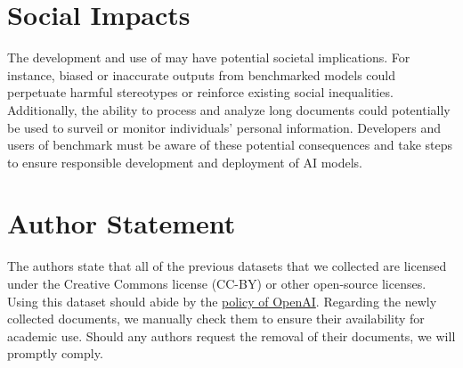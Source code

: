 \section{Social Impacts}
\label{appendix: social_impacts}
The development and use of \benchmarkname may have potential societal implications. For instance, biased or inaccurate outputs from benchmarked models could perpetuate harmful stereotypes or reinforce existing social inequalities. Additionally, the ability to process and analyze long documents could potentially be used to surveil or monitor individuals' personal information. Developers and users of \benchmarkname benchmark must be aware of these potential consequences and take steps to ensure responsible development and deployment of AI models.

\section{Author Statement}
\label{appendix: author_statement}
The authors state that all of the previous datasets that we collected are licensed under the Creative Commons license (CC-BY) or other open-source licenses. Using this dataset should abide by the \href{https://openai.com/policies/terms-of-use}{policy of OpenAI}. Regarding the newly collected documents, we manually check them to ensure their availability for academic use. Should any authors request the removal of their documents, we will promptly comply.